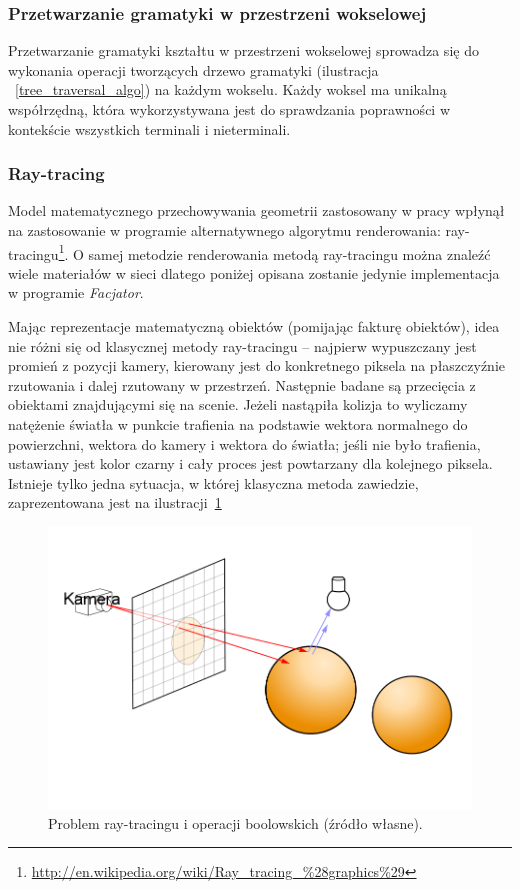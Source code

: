 \subsubsection{Przetwarzanie gramatyki w przestrzeni wokselowej}
Przetwarzanie gramatyki kształtu w przestrzeni wokselowej sprowadza się
do wykonania operacji tworzących drzewo gramatyki (ilustracja
~\ref{tree_traversal_algo}) na każdym wokselu. Każdy woksel ma unikalną
współrzędną, która wykorzystywana jest do sprawdzania poprawności w kontekście
wszystkich terminali i nieterminali.

\subsubsection{Ray-tracing}
Model matematycznego przechowywania geometrii zastosowany w pracy wpłynął na
zastosowanie w programie alternatywnego algorytmu renderowania:
ray-tracingu\footnote{\url{http://en.wikipedia.org/wiki/Ray\_tracing\_\%28graphics\%29}}.
O samej metodzie renderowania metodą ray-tracingu można znaleźć wiele materiałów
w sieci dlatego poniżej opisana zostanie jedynie implementacja w programie
\emph{Facjator}.

Mając reprezentacje matematyczną obiektów (pomijając fakturę obiektów), idea nie
różni się od klasycznej metody ray-tracingu -- najpierw wypuszczany jest promień
z pozycji kamery, kierowany jest do konkretnego piksela na płaszczyźnie
rzutowania i dalej rzutowany w przestrzeń. Następnie badane są przecięcia z
obiektami znajdującymi się na scenie. Jeżeli nastąpiła kolizja to wyliczamy
natężenie światła w punkcie trafienia na podstawie wektora normalnego do
powierzchni, wektora do kamery i wektora do światła; jeśli nie było trafienia,
ustawiany jest kolor czarny i cały proces jest powtarzany dla kolejnego piksela.
Istnieje tylko jedna sytuacja, w której klasyczna metoda zawiedzie,
zaprezentowana jest na ilustracji~\ref{ray_trace01}

\begin{figure}[h]
  \centering
  \includegraphics[width=12cm]{images/ray_trace01.png}
  \caption{Problem ray-tracingu i operacji boolowskich (źródło własne).}
  \label{ray_trace01}
\end{figure}

